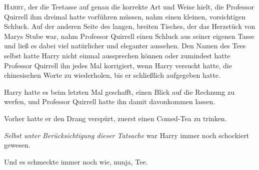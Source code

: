 
\lettrine{H}{arry}, der die Teetasse auf genau die korrekte Art und Weise hielt, die Professor Quirrell ihm dreimal hatte vorführen müssen, nahm einen kleinen, vorsichtigen Schluck. Auf der anderen Seite des langen, breiten Tisches, der das Herzstück von Marys Stube war, nahm Professor Quirrell einen Schluck aus seiner eigenen Tasse und ließ es dabei viel natürlicher und eleganter aussehen. Den Namen des Tees selbst hatte Harry nicht einmal aussprechen können oder zumindest hatte Professor Quirrell ihn jedes Mal korrigiert, wenn Harry versucht hatte, die chinesischen Worte zu wiederholen, bis er schließlich aufgegeben hatte.

Harry hatte es beim letzten Mal geschafft, einen Blick auf die Rechnung zu werfen, und Professor Quirrell hatte ihn damit davonkommen lassen.

Vorher hatte er den Drang verspürt, zuerst einen Comed-Tea zu trinken.

\emph{Selbst unter Berücksichtigung dieser Tatsache} war Harry immer noch schockiert gewesen.

Und es schmeckte immer noch wie, nunja, Tee.

